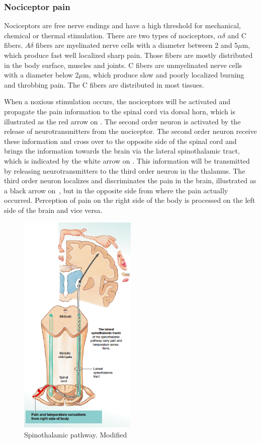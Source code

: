 \subsubsection{Nociceptor pain}
Nociceptors are free nerve endings and have a high threshold for mechanical, chemical or thermal stimulation. There are two types of nociceptors, $\alpha\delta$ and C fibers. $A\delta$ fibers are myelinated nerve cells with a diameter between 2 and 5$\mu$m, which produce fast well localized sharp pain. Those fibers are mostly distributed in the body surface, muscles and joints. C fibers are unmyelinated nerve cells with a diameter below 2$\mu$m, which produce slow and poorly localized burning and throbbing pain. The C fibers are distributed in most tissues. \cite{Steeds2013}

When a noxious stimulation occurs, the nociceptors will be activated and propagate the pain information to the spinal cord via dorsal horn, which is illustrated as the red arrow on . The second order neuron is activated by the release of neurotransmitters from the nociceptor. The second order neuron receive these information and cross over to the opposite side of the spinal cord and brings the information towards the brain via the lateral spinothalamic tract, which is indicated by the white arrow on . This information will be transmitted by releasing neurotransmitters to the third order neuron in the thalamus. The third order neuron localizes and discriminates the pain in the brain, illustrated as a black arrow on~, but in the opposite side from where the pain actually occurred. Perception of pain on the right side of the body is processed on the left side of the brain and vice versa. \cite{Martini2012} 


\begin{figure}[H]
	\includegraphics[width=0.5\textwidth]{figures/pathways.png} 
	\caption{Spinothalamic pathway. Modified~\cite{Martini2012}}
	\label{fig:pathways}  
\end{figure}   

